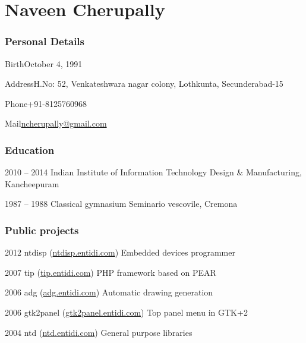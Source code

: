 \documentclass{tccv}
\begin{document}
\part{Naveen Cherupally}


\section{Personal Details}
\begin{factlist}
\item{Birth}{October 4, 1991}
\item{Address}{H.No: 52, Venkateshwara nagar colony, Lothkunta, Secunderabad-15}
\item{Phone}{+91-8125760968}
\item{Mail}{\url{ncherupally@gmail.com}}
\end{factlist}

\section{Education}

\begin{yearlist}

\item{2010 -- 2014}
     {Indian Institute of Information Technology Design \& Manufacturing, Kancheepuram}
     

\item{1987 -- 1988}
     {Classical gymnasium}
     {Seminario vescovile, Cremona}

\end{yearlist}

\section{Public projects}

\begin{yearlist}

\item{2012}
     {ntdisp (\href{http://ntdisp.entidi.com/}{ntdisp.entidi.com})}
     {Embedded devices programmer}

\item{2007}
     {tip (\href{http://tip.entidi.com/}{tip.entidi.com})}
     {PHP framework based on PEAR}

\item{2006}
     {adg (\href{http://adg.entidi.com/}{adg.entidi.com})}
     {Automatic drawing generation}

\item{2006}
     {gtk2panel (\href{http://gtk2panel.entidi.com/}{gtk2panel.entidi.com})}
     {Top panel menu in GTK+2}

\item{2004}
     {ntd (\href{http://ntd.entidi.com/}{ntd.entidi.com})}
     {General purpose libraries}

\end{yearlist}
\end{document}
